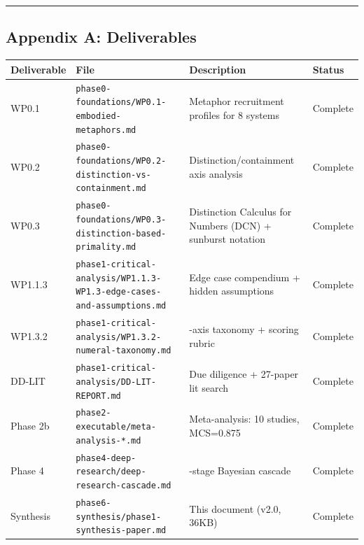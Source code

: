 \documentclass[
]{article}
\newcounter{none} %
\begin{document}
\begin{center}\rule{0.5\linewidth}{0.5pt}\end{center}

\subsection{Appendix A: Deliverables}\label{appendix-a-deliverables}

{\def\LTcaptype{none} %
\begin{longtable}[]{@{}
  >{\raggedright\arraybackslash}p{}
  >{\raggedright\arraybackslash}p{}
  >{\raggedright\arraybackslash}p{}
  >{\centering\arraybackslash}p{}@{}}
\toprule\noalign{}
\begin{minipage}[b]{\linewidth}\raggedright
Deliverable
\end{minipage} & \begin{minipage}[b]{\linewidth}\raggedright
File
\end{minipage} & \begin{minipage}[b]{\linewidth}\raggedright
Description
\end{minipage} & \begin{minipage}[b]{\linewidth}\centering
Status
\end{minipage} \\
\midrule\noalign{}
\endhead
\bottomrule\noalign{}
\endlastfoot
WP0.1 & \texttt{phase0-foundations/WP0.1-embodied-metaphors.md} &
Metaphor recruitment profiles for 8 systems & Complete \\
WP0.2 & \texttt{phase0-foundations/WP0.2-distinction-vs-containment.md}
& Distinction/containment axis analysis & Complete \\
WP0.3 & \texttt{phase0-foundations/WP0.3-distinction-based-primality.md}
& Distinction Calculus for Numbers (DCN) + sunburst notation &
Complete \\
WP1.1.3 &
\texttt{phase1-critical-analysis/WP1.1.3-WP1.3-edge-cases-and-assumptions.md}
& Edge case compendium + hidden assumptions & Complete \\
WP1.3.2 & \texttt{phase1-critical-analysis/WP1.3.2-numeral-taxonomy.md}
& 9-axis taxonomy + scoring rubric & Complete \\
DD-LIT & \texttt{phase1-critical-analysis/DD-LIT-REPORT.md} & Due
diligence + 27-paper lit search & Complete \\
Phase 2b & \texttt{phase2-executable/meta-analysis-*.md} &
Meta-analysis: 10 studies, MCS=0.875 & Complete \\
Phase 4 & \texttt{phase4-deep-research/deep-research-cascade.md} &
9-stage Bayesian cascade & Complete \\
Synthesis & \texttt{phase6-synthesis/phase1-synthesis-paper.md} & This
document (v2.0, 36KB) & Complete \\
\end{longtable}
}
\end{document}
